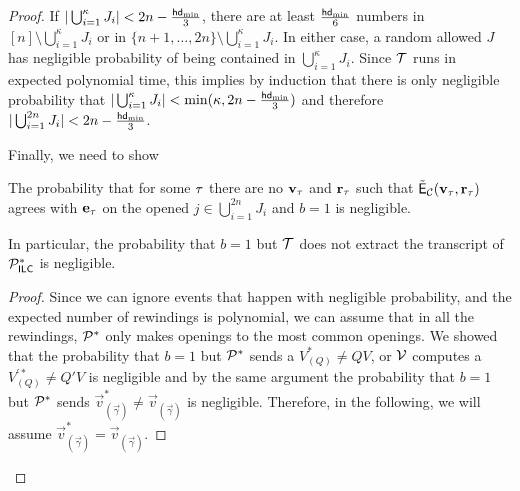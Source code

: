 \begin{proof}
If $|\bigcup_{i=1}^\kappa J_i|<2n-\frac{\mathsf{hd}_{\mathrm{min}}}{3}$, there are at least $\frac{\mathsf{hd}_{\mathrm{min}}}{6}$ numbers in $[n]\setminus \bigcup_{i=1}^\kappa J_i$ or in $\{n+1,\dots,2n\}\setminus \bigcup_{i=1}^\kappa J_i$. In either case, a random allowed $J$ has negligible probability of being contained in $\bigcup_{i=1}^\kappa J_i$. Since $\mathcal{T}$ runs in expected polynomial time, this implies by induction that there is only negligible probability that $|\bigcup_{i=1}^{\kappa}J_i|<\min(\kappa,2n-\frac{\mathsf{hd}_{\mathrm{min}}}{3})$ and therefore $|\bigcup_{i=1}^{2n}J_i|<2n-\frac{\mathsf{hd}_{\mathrm{min}}}{3}$. 

Finally, we need to show 
\begin{lemma}\label{lem:malform}
The probability that for some $\tau$ there are no $\mathbf{v}_\tau$ and $\mathbf{r}_\tau$ such that $\tilde{\mathsf{E}}_{\mathcal{C}}(\mathbf{v}_\tau,\mathbf{r}_\tau)$ agrees with $\mathbf{e}_\tau$ on the opened $j\in \bigcup_{i=1}^{2n}J_i$ and $b=1$ is negligible. 

In particular, the probability that $b=1$ but $\mathcal{T}$ does not extract the transcript of $\mathcal{P}_{\mathsf{ILC}}^*$ is negligible. 
\end{lemma}
\begin{proof}
Since we can ignore events that happen with negligible probability, and the expected number of rewindings is polynomial, we can assume that in all the rewindings, $\mathcal{P}^*$ only makes openings to the most common openings. 
We showed that the probability that $b=1$ but $\mathcal{P}^*$ sends a $V_{(Q)}^*\neq QV$, or $\mathcal{V}$ computes a $V_{(Q)}^{'*}\neq Q'V$ is negligible and by the same argument the probability that $b=1$ but $\mathcal{P}^*$ sends
$\vec{v}^*_{(\vec{\gamma})}\neq \vec{v}_{(\vec{\gamma})}$ is negligible. Therefore, in the following, we will assume $\vec{v}^*_{(\vec{\gamma})}=\vec{v}_{(\vec{\gamma})}$.


\end{proof}
\end{proof}
